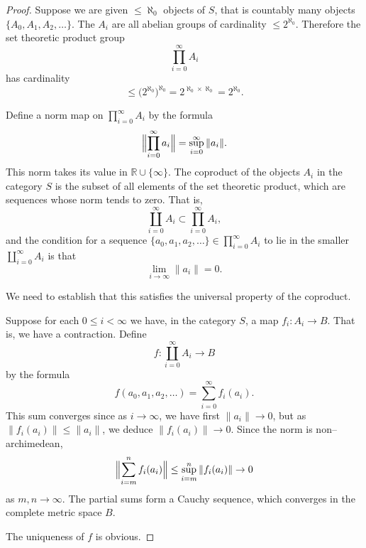 \documentclass[11pt,a4paper]{article}
\theoremstyle{plain}
\theoremstyle{definition}
\numberwithin{equation}{section}
\begin{document}
\begin{proof}
Suppose we are given $\leq\aleph_{0}$ objects of $S$, that is countably many objects $\{A_{0}, A_{1}, A_{2}, \ldots\}$. The $A_{i}$ are all abelian groups of cardinality $\leq 2^{\aleph_{0}}$. Therefore the set theoretic product group
\begin{equation*}
\prod_{i=0}^{\infty} A_{i}
\end{equation*}
has cardinality
\begin{equation*}
\leq \bigl(2^{\aleph_{0}}\bigr)^{\aleph_{0}} = 2^{\aleph_{0} \times \aleph_{0}} = 2^{\aleph_{0}}.
\end{equation*}

Define a norm map on $\prod_{i=0}^{\infty} A_{i}$ by the formula
\begin{equation*}
\Bigl\|\prod_{i=0}^{\infty} a_{i}\Bigr\| = \sup_{i=0}^{\infty} \|a_{i}\|.
\end{equation*}
This norm takes its value in $\mathbb{R} \cup \{\infty\}$. The coproduct of the objects $A_{i}$ in the category $S$ is the subset of all elements of the set theoretic product, which are sequences whose norm tends to zero. That is,
\begin{equation*}
\coprod_{i=0}^{\infty} A_{i} \subset \prod_{i=0}^{\infty} A_{i},
\end{equation*}
and the condition for a sequence $\{a_{0}, a_{1}, a_{2}, \ldots\} \in \prod_{i=0}^{\infty} A_{i}$ to lie in the smaller $\coprod_{i=0}^{\infty} A_{i}$ is that
\begin{equation*}
\lim_{i\to\infty} \|a_{i}\| = 0.
\end{equation*}

We need to establish that this satisfies the universal property of the coproduct.

Suppose for each $0 \leq i < \infty$ we have, in the category $S$, a map $f_{i}: A_{i} \to B$. That is, we have a contraction. Define
\begin{equation*}
f: \coprod_{i=0}^{\infty} A_{i} \longrightarrow B
\end{equation*}
by the formula
\begin{equation*}
f(a_{0}, a_{1}, a_{2}, \ldots) = \sum_{i=0}^{\infty} f_{i}(a_{i}).
\end{equation*}
This sum converges since as $i \to \infty$, we have first $\|a_{i}\| \to 0$, but as $\|f_{i}(a_{i})\| \leq \|a_{i}\|$, we deduce $\|f_{i}(a_{i})\| \to 0$. Since the norm is non--archimedean,
\begin{equation*}
\Bigl\|\sum_{i=m}^{n} f_{i}(a_{i})\Bigr\| \leq \sup_{i=m}^{n} \|f_{i}(a_{i})\| \to 0
\end{equation*}
as $m,n \to \infty$. The partial sums form a Cauchy sequence, which converges in the complete metric space $B$.

The uniqueness of $f$ is obvious.
\end{proof}
\end{document}
